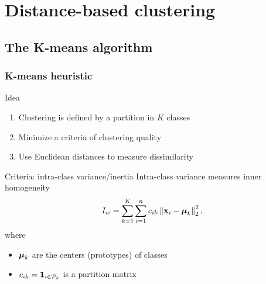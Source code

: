 \documentclass{beamer}\usepackage[]{graphicx}\usepackage[]{color}
\begin{document}
\section{Distance-based clustering}

\subsection{The K-means algorithm}

\begin{frame}
  
  \frametitle{K-means heuristic}
  
  \begin{block}{Idea}
    \begin{enumerate}
      \item Clustering is defined by a partition in $K$ classes
      \item Minimize a criteria of clustering quality
      \item Use Euclidean distances to measure dissimilarity
    \end{enumerate}
  \end{block}

  \begin{block}{Criteria: intra-class variance/inertia}
    Intra-class variance measures \alert{inner} homogeneity
    \begin{equation*}
      I_w = \sum_{k=1}^K \sum_{i=1}^n c_{ik} \left\| \mathbf{x}_i - \boldsymbol{\mu}_k \right\|_2^2,
    \end{equation*} 
    where 
    \begin{itemize}
      \item $\boldsymbol{\mu}_k$ are the centers (prototypes) of classes
      \item $c_{ik} = \mathbf{1}_{i\in\mathcal{P}_k}$ is a partition matrix
    \end{itemize}
  \end{block}

\end{frame}
\end{document}
